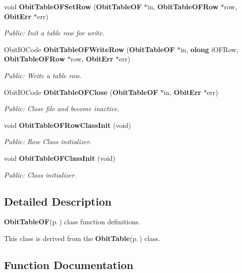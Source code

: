 \begin{CompactItemize}
void {\bf Obit\-Table\-OFSet\-Row} ({\bf Obit\-Table\-OF} $\ast$in, {\bf Obit\-Table\-OFRow} $\ast$row, {\bf Obit\-Err} $\ast$err)
\begin{CompactList}\small\item\em Public: Init a table row for write. \item\end{CompactList}\item 
Obit\-IOCode {\bf Obit\-Table\-OFWrite\-Row} ({\bf Obit\-Table\-OF} $\ast$in, {\bf olong} i\-OFRow, {\bf Obit\-Table\-OFRow} $\ast$row, {\bf Obit\-Err} $\ast$err)
\begin{CompactList}\small\item\em Public: Write a table row. \item\end{CompactList}\item 
Obit\-IOCode {\bf Obit\-Table\-OFClose} ({\bf Obit\-Table\-OF} $\ast$in, {\bf Obit\-Err} $\ast$err)
\begin{CompactList}\small\item\em Public: Close file and become inactive. \item\end{CompactList}\item 
void {\bf Obit\-Table\-OFRow\-Class\-Init} (void)
\begin{CompactList}\small\item\em Public: Row Class initializer. \item\end{CompactList}\item 
void {\bf Obit\-Table\-OFClass\-Init} (void)
\begin{CompactList}\small\item\em Public: Class initializer. \item\end{CompactList}\end{CompactItemize}


\subsection{Detailed Description}
{\bf Obit\-Table\-OF}{\rm (p.\,\pageref{structObitTableOF})} class function definitions. 

This class is derived from the {\bf Obit\-Table}{\rm (p.\,\pageref{structObitTable})} class.

\subsection{Function Documentation}
